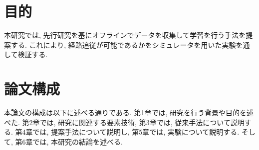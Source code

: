 




\newpage
\section{目的}
本研究では, 先行研究を基にオフラインでデータを収集して学習を行う手法を提案する. これにより, 経路追従が可能であるかをシミュレータを用いた実験を通して検証する. 

\section{論文構成}
本論文の構成は以下に述べる通りである. 第1章では, 研究を行う背景や目的を述べた. 第2章では, 研究に関連する要素技術, 第3章では, 従来手法について説明する. 第4章では, 提案手法について説明し, 第5章では, 実験について説明する. そして, 第6章では, 本研究の結論を述べる. 
     

